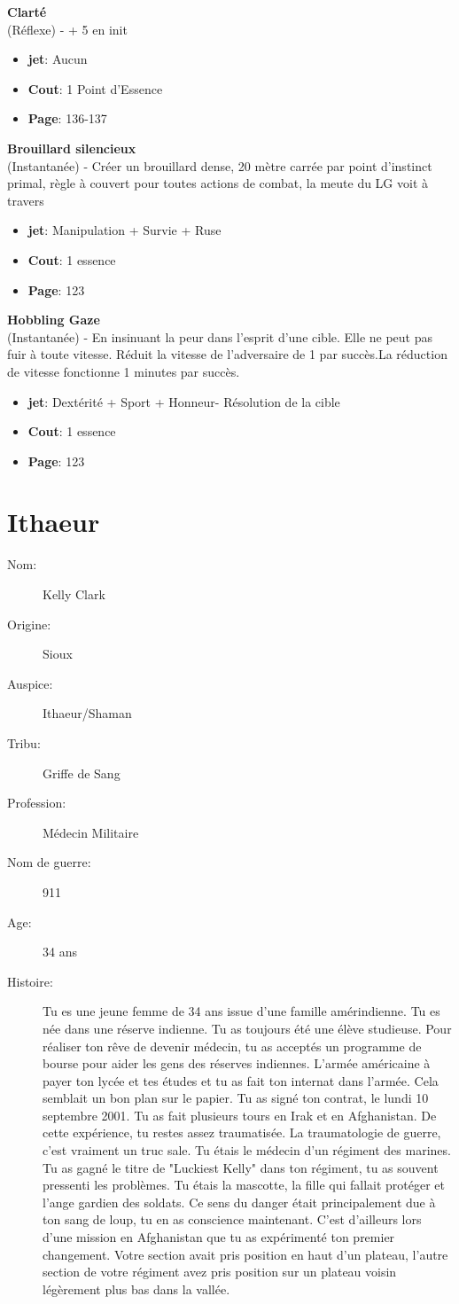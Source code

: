 \documentclass[oneside,12pt]{book}
\newcommand\don[6]{
\textbf{#1} \\
(#6) - #2
\begin{itemize}
\item{ \textbf{jet}: #3}
\item{ \textbf{Cout}: #4}
\item{ \textbf{Page}: #5}
\end{itemize}
\vspace{0.5cm}
}
\begin{document}
\begin{flushleft}
\don{Clarté}{+ 5 en init}{Aucun}{1 Point d'Essence}{136-137}{Réflexe}
\don{Brouillard silencieux}{Créer un brouillard dense, 20 mètre carrée par point d'instinct primal, règle à couvert pour toutes actions de combat, la meute du LG voit à travers}{Manipulation + Survie + Ruse}{1 essence}{123}{Instantanée}
\don{Hobbling Gaze}{En insinuant la peur dans l'esprit d'une cible. Elle ne peut pas fuir à toute vitesse. Réduit la vitesse de l'adversaire de 1 par succès.La réduction de vitesse fonctionne 1 minutes par succès.}{Dextérité + Sport + Honneur- Résolution de la cible}{1 essence}{123}{Instantanée}

\clearpage
\section{Ithaeur}
\begin{description}
\item[Nom:]{Kelly Clark}
\item[Origine:]{Sioux}
\item[Auspice:]{Ithaeur/Shaman}
\item[Tribu:]{Griffe de Sang}
\item[Profession:]{Médecin Militaire}
\item[Nom de guerre:]{911}
\item[Age:]{34 ans}
\item[Histoire:]{
Tu es une jeune femme de 34 ans issue d'une famille amérindienne. Tu es née dans une réserve indienne. Tu as toujours été une élève studieuse. Pour réaliser ton rêve de devenir médecin, tu as acceptés un
programme de bourse pour aider les gens des réserves indiennes. L'armée américaine à payer ton lycée et tes études et tu as fait ton internat dans l'armée. Cela semblait un bon plan sur le papier. Tu as
signé ton contrat, le lundi 10 septembre 2001.
Tu as fait plusieurs tours en Irak et en Afghanistan. De cette expérience, tu restes assez traumatisée. La traumatologie de guerre, c'est vraiment un truc sale. Tu étais le médecin d'un régiment des
marines.
Tu as gagné le titre de "Luckiest Kelly" dans ton régiment, tu as souvent pressenti les problèmes. Tu étais la mascotte, la fille qui fallait protéger et l'ange gardien des soldats.
Ce sens du danger était principalement due à ton sang de loup, tu en as conscience maintenant. C'est d'ailleurs lors d'une mission en Afghanistan que tu as expérimenté ton premier changement.
Votre section avait pris position en haut d'un plateau, l'autre section de votre régiment avez pris position sur un plateau voisin légèrement plus bas dans la vallée.
}
\end{description}
\end{flushleft}
\end{document}
